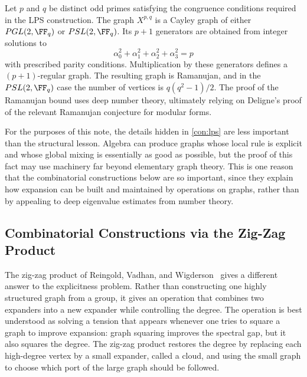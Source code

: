 \begin{construction}
	\label{con:lps}
	Let \(p\) and \(q\) be distinct odd primes satisfying the congruence conditions required in the LPS construction. The graph \(X^{p,q}\) is a Cayley graph of either \(\mathrm{PGL}(2,\FF_q)\) or \(\mathrm{PSL}(2,\FF_q)\). Its \(p+1\) generators are obtained from integer solutions to
	\begin{equation}
		\label{eq:lps-four-square-equation}
		\alpha_0^2+\alpha_1^2+\alpha_2^2+\alpha_3^2=p
	\end{equation}
	with prescribed parity conditions. Multiplication by these generators defines a \((p+1)\)-regular graph. The resulting graph is Ramanujan, and in the \(\mathrm{PSL}(2,\FF_q)\) case the number of vertices is \(q(q^2-1)/2\). The proof of the Ramanujan bound uses deep number theory, ultimately relying on Deligne's proof of the relevant Ramanujan conjecture for modular forms.
\end{construction}

For the purposes of this note, the details hidden in \cref{con:lps} are less important than the structural lesson. Algebra can produce graphs whose local rule is explicit and whose global mixing is essentially as good as possible, but the proof of this fact may use machinery far beyond elementary graph theory. This is one reason that the combinatorial constructions below are so important, since they explain how expansion can be built and maintained by operations on graphs, rather than by appealing to deep eigenvalue estimates from number theory.

\subsection{Combinatorial Constructions via the Zig-Zag Product}
\label{subsec:zig-zag}

The zig-zag product of Reingold, Vadhan, and Wigderson~\cite{RVW2002} gives a different answer to the explicitness problem. Rather than constructing one highly structured graph from a group, it gives an operation that combines two expanders into a new expander while controlling the degree. The operation is best understood as solving a tension that appears whenever one tries to square a graph to improve expansion: graph squaring improves the spectral gap, but it also squares the degree. The zig-zag product restores the degree by replacing each high-degree vertex by a small expander, called a cloud, and using the small graph to choose which port of the large graph should be followed.

